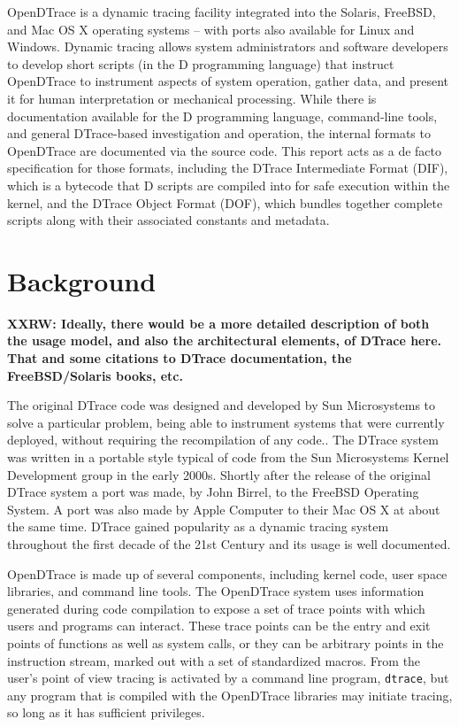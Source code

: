 OpenDTrace is a dynamic tracing facility integrated into the Solaris, FreeBSD,
and Mac OS X operating systems -- with ports also available for Linux and
Windows.
Dynamic tracing allows system administrators and software developers to
develop short scripts (in the D programming language) that instruct
OpenDTrace to
instrument aspects of system operation, gather data, and present it for human
interpretation or mechanical processing.
While there is documentation available for the D programming
language, command-line tools, and general DTrace-based investigation and
operation, the internal formats to OpenDTrace are documented via the
source code.
This report acts as a de facto specification for those formats, including
the DTrace Intermediate Format (DIF), which is a bytecode that D scripts are
compiled into for safe execution within the kernel, and the DTrace Object
Format (DOF), which bundles together complete scripts along with their
associated constants and metadata.

\section{Background}

\textbf{XXRW: Ideally, there would be a more detailed description of both the
usage model, and also the architectural elements, of DTrace here.
That and some citations to DTrace documentation, the FreeBSD/Solaris books,
etc.}

The original DTrace code was designed and developed by Sun
Microsystems to solve a particular problem, being able to instrument
systems that were currently deployed, without requiring the
recompilation of any code.\cite{DTrace2004}.  The DTrace system was
written in a portable style typical of code from the Sun Microsystems
Kernel Development group in the early 2000s.  Shortly after the
release of the original DTrace system a port was made, by John Birrel,
to the FreeBSD Operating System.  A port was also made by Apple
Computer to their Mac OS X at about the same time.  DTrace gained
popularity as a dynamic tracing system throughout the first decade of
the 21st Century and its usage is well documented.\cite{}

OpenDTrace is made up of several components, including kernel code,
user space libraries, and command line tools.  The OpenDTrace system
uses information generated during code compilation to expose a set of
trace points with which users and programs can interact.  These trace
points can be the entry and exit points of functions as well as system
calls, or they can be arbitrary points in the instruction stream,
marked out with a set of standardized macros.  From the user's point
of view tracing is activated by a command line program,
\texttt{dtrace}, but any program that is compiled with the OpenDTrace
libraries may initiate tracing, so long as it has sufficient
privileges.

